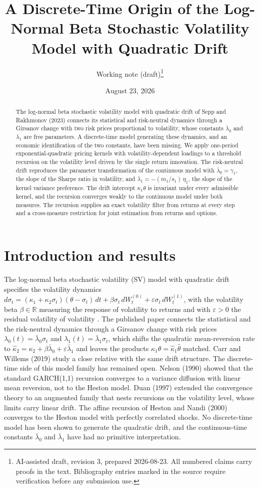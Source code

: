 \documentclass[11pt]{article}
\title{A Discrete-Time Origin of the Log-Normal Beta Stochastic Volatility
Model with Quadratic Drift}
\author{Working note (draft)\thanks{AI-assisted draft, revision 3, prepared
2026-08-23. All numbered claims carry proofs in the text. Bibliography
entries marked in the source require verification before any submission
use.}}
\date{August 23, 2026}
\theoremstyle{remark}
\newcommand{\R}{\mathbb{R}}
\begin{document}
\maketitle

\begin{abstract}
The log-normal beta stochastic volatility model with quadratic drift of Sepp
and Rakhmonov (2023) connects its statistical and risk-neutral dynamics
through a Girsanov change with two risk prices proportional to volatility,
whose constants $\bar\lambda_0$ and $\bar\lambda_1$ are free parameters.
A discrete-time model generating these dynamics, and an economic
identification of the two constants, have been missing.
We apply one-period exponential-quadratic pricing kernels with
volatility-dependent loadings to a threshold recursion on the volatility
level driven by the single return innovation.
The risk-neutral drift reproduces the parameter transformation of the
continuous model with $\bar\lambda_0=\gamma_1$, the slope of the Sharpe
ratio in volatility, and $\bar\lambda_1=-(m_1/s_1)\,\eta_1$, the slope of
the kernel variance preference.
The drift intercept $\kappa_1\theta$ is invariant under every admissible
kernel, and the recursion converges weakly to the continuous model under
both measures.
The recursion supplies an exact volatility filter from returns at every
step and a cross-measure restriction for joint estimation from returns and
options.
\end{abstract}

\section{Introduction and results}\label{sec:intro}

The log-normal beta stochastic volatility (SV) model with quadratic drift
specifies the volatility dynamics
$d\sigma_t=(\kappa_1+\kappa_2\sigma_t)(\theta-\sigma_t)\,dt
+\beta\sigma_t\,dW^{(0)}_t+\varepsilon\sigma_t\,dW^{(1)}_t$, with the
volatility beta $\beta\in\R$ measuring the response of volatility to
returns and with $\varepsilon>0$ the residual volatility of volatility
\cite{SeppRakhmonov2023}.
The published paper connects the statistical and the risk-neutral dynamics
through a Girsanov change with risk prices
$\lambda_0(t)=\bar\lambda_0\sigma_t$ and
$\lambda_1(t)=\bar\lambda_1\sigma_t$, which shifts the quadratic
mean-reversion rate to
$\hat\kappa_2=\kappa_2+\beta\bar\lambda_0+\varepsilon\bar\lambda_1$ and
leaves the products $\kappa_1\theta=\hat\kappa_1\hat\theta$ matched.
Carr and Willems (2019) study a close relative with the same drift
structure.
The discrete-time side of this model family has remained open.
Nelson (1990) showed that the standard GARCH(1,1) recursion converges to a
variance diffusion with linear mean reversion, not to the Heston model.
Duan (1997) extended the convergence theory to an augmented family that
nests recursions on the volatility level, whose limits carry linear
drift.
The affine recursion of Heston and Nandi (2000) converges to the Heston
model with perfectly correlated shocks.
No discrete-time model has been shown to generate the quadratic drift, and
the continuous-time constants $\bar\lambda_0$ and $\bar\lambda_1$ have had
no primitive interpretation.
\end{document}
